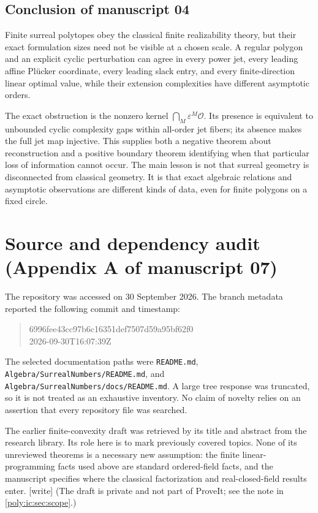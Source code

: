 \documentclass[11pt,a4paper]{article}
\numberwithin{equation}{section}
\theoremstyle{plain}
\newcommand{\wtag}{\textup{[write]}}%
\newcommand{\eps}{\varepsilon}
\newcommand{\OO}{\mathcal O}
\newcommand{\code}[1]{\texttt{\small #1}}
\begin{document}
\subsection{Conclusion of manuscript 04}
Finite surreal polytopes obey the classical finite realizability theory,
but their exact formulation sizes need not be visible at a chosen scale.
A regular polygon and an explicit cyclic perturbation can agree in every
power jet, every leading affine Pl\"ucker coordinate, every leading slack
entry, and every finite-direction linear optimal value, while their
extension complexities have different asymptotic orders.

The exact obstruction is the nonzero kernel
$\bigcap_M\eps^M\OO$. Its presence is equivalent to unbounded cyclic
complexity gaps within all-order jet fibers; its absence makes the full
jet map injective. This supplies both a negative theorem about
reconstruction and a positive boundary theorem identifying when that
particular loss of information cannot occur. The main lesson is not
that surreal geometry is disconnected from classical geometry. It is
that exact algebraic relations and asymptotic observations are different
kinds of data, even for finite polygons on a fixed circle.

\section{Source and dependency audit (Appendix A of manuscript 07)}\label{poly:ic:app:audit}

The repository was accessed on 30 September 2026. The branch metadata
reported the following commit and timestamp:
\begin{quote}\small\ttfamily
6996fee43cc97b6c16351def7507d59a95bf62f0\\
2026-09-30T16:07:39Z
\end{quote}
The selected documentation paths were
\code{README.md}, \code{Algebra/SurrealNumbers/README.md}, and
\code{Algebra/SurrealNumbers/docs/README.md}. A large tree response was
truncated, so it is not treated as an exhaustive inventory. No claim of
novelty relies on an assertion that every repository file was searched.

The earlier finite-convexity draft was retrieved by its title and abstract
from the research library. Its role here is to mark previously covered
topics. None of its unreviewed theorems is a necessary new assumption:
the finite linear-programming facts used above are standard ordered-field
facts, and the manuscript specifies where the classical factorization
and real-closed-field results enter.
\wtag{} (The draft is private and not part of ProveIt; see the note in
\cref{poly:ic:sec:scope}.)
\end{document}
